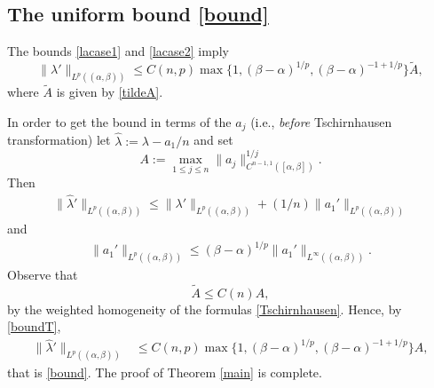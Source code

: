 \documentclass[12pt]{amsart}
\theoremstyle{plain}
\theoremstyle{definition}
\numberwithin{equation}{section}
\begin{document}
\subsection{The uniform bound \texorpdfstring{\eqref{bound}}{(1.2)}} \label{secbound}

The bounds \eqref{lacase1} and \eqref{lacase2} imply
\begin{equation} \label{boundT}
  \|{\lambda}' \|_{L^p(({\alpha},{\beta}))}  \le C(n,p) \max \{1, ({\beta}-{\alpha})^{1/p}, ({\beta}-{\alpha})^{-1+1/p}\}   \tilde A,
\end{equation}
where $\tilde A$ is given by \eqref{tildeA}.

In order to get the bound in terms of the $a_j$ (i.e., \emph{before} Tschirnhausen transformation) 
let $\hat {\lambda} := {\lambda} - a_1/n$ and set
\[
  A := \max_{1 \le j \le n} \|a_j\|^{1/j}_{C^{n-1,1}([{\alpha},{\beta}])}. 
\] 
Then
\begin{align*}
  \|\hat {\lambda}'\|_{L^p(({\alpha},{\beta}))} \le \|{\lambda}'\|_{L^p(({\alpha},{\beta}))} + (1/n)\|a_1'\|_{L^p(({\alpha},{\beta}))} 
\end{align*}
and 
\begin{align*}
  \|a_1'\|_{L^p(({\alpha},{\beta}))} \le ({\beta}-{\alpha})^{1/p} \|a_1'\|_{L^\infty(({\alpha},{\beta}))}.
\end{align*}
Observe that
\[
  \tilde A \le C(n) A, 
\] 
by the weighted homogeneity of the formulas \eqref{Tschirnhausen}.
Hence, by \eqref{boundT}, 
\begin{align*} 
  \|\hat {\lambda}' \|_{L^p(({\alpha},{\beta}))}  &\le C(n,p) \max\{1, ({\beta}-{\alpha})^{1/p}, ({\beta}-{\alpha})^{-1+1/p}\}   A,
\end{align*}
that is \eqref{bound}.
The proof of Theorem \ref{main} is complete.
\end{document}
